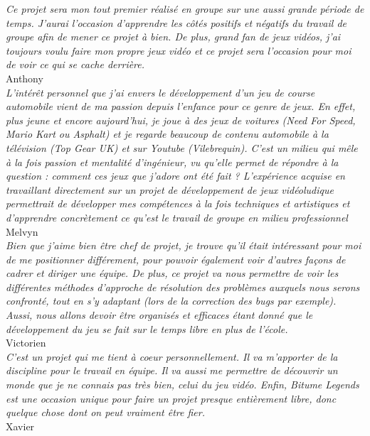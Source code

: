 \documentclass[12pt,a4paper]{article}
\begin{document}
\indent\textit{Ce projet sera mon tout premier réalisé en groupe sur une aussi grande période de temps. 
    J'aurai l'occasion d'apprendre les côtés positifs et négatifs du travail de groupe afin de mener ce 
    projet à bien. De plus, grand fan de jeux vidéos, j'ai toujours voulu faire mon propre jeux vidéo et ce 
projet sera l'occasion pour moi de voir ce qui se cache derrière.} \\
\indent Anthony\\[0.3cm]
\indent\textit{L'intérêt personnel que j'ai envers le développement d'un jeu de course automobile vient de ma 
    passion depuis l'enfance pour ce genre de jeux. En effet, plus jeune et encore aujourd'hui, je joue
    à des jeux de voitures (Need For Speed, Mario Kart ou Asphalt) et je regarde beaucoup de contenu automobile
    à la télévision (Top Gear UK) et sur Youtube (Vilebrequin). C'est un milieu qui mêle à la fois passion et 
    mentalité d'ingénieur, vu qu'elle permet de répondre à la question : comment ces jeux que j'adore ont été 
    fait ? L'expérience acquise en travaillant directement sur un projet de développement de jeux vidéoludique 
    permettrait de développer mes compétences à la fois techniques et artistiques et d'apprendre concrètement 
ce qu'est le travail de groupe en milieu professionnel} \\
\indent Melvyn\\[0.3cm]
\indent\textit{Bien que j'aime bien être chef de projet, je trouve qu'il était intéressant 
    pour moi de me positionner différement, pour pouvoir également voir d'autres façons 
    de cadrer et diriger une équipe. De plus, ce projet va nous permettre de voir les différentes
    méthodes d'approche de résolution des problèmes auxquels nous serons confronté, tout en s'y
    adaptant (lors de la correction des bugs par exemple). Aussi, nous allons devoir être organisés
et efficaces étant donné que le développement du jeu se fait sur le temps libre en plus de l'école.} \\
\indent Victorien\\[0.3cm]
\indent\textit{C'est un projet qui me tient à coeur personnellement. Il va m'apporter de la discipline pour le travail
    en équipe. Il va aussi me permettre de découvrir un monde que je ne connais pas très bien, celui du jeu vidéo.
    Enfin, Bitume Legends est une occasion unique pour faire un projet presque entièrement libre, donc quelque
chose dont on peut vraiment être fier.} \\
\indent Xavier
\clearpage
\end{document}
